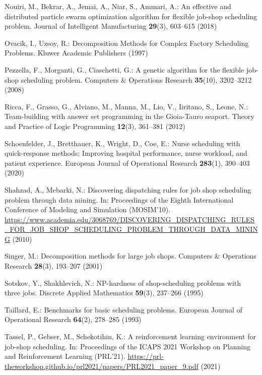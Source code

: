 \begin{thebibliography}{10}
Nouiri, M., Bekrar, A., Jemai, A., Niar, S., Ammari, A.: An effective and
  distributed particle swarm optimization algorithm for flexible job-shop
  scheduling problem. Journal of Intelligent Manufacturing  \textbf{29}(3),
  603--615 (2018)

Ovacik, I., Uzsoy, R.: Decomposition Methods for Complex Factory Scheduling
  Problems. Kluwer Academic Publishers (1997)

Pezzella, F., Morganti, G., Ciaschetti, G.: A genetic algorithm for the
  flexible job-shop scheduling problem. Computers \& Operations Research
  \textbf{35}(10),  3202--3212 (2008)

Ricca, F., Grasso, G., Alviano, M., Manna, M., Lio, V., Iiritano, S., Leone,
  N.: Team-building with answer set programming in the {G}ioia-{T}auro seaport.
  Theory and Practice of Logic Programming  \textbf{12}(3),  361--381 (2012)

Schoenfelder, J., Bretthauer, K., Wright, D., Coe, E.: Nurse scheduling with
  quick-response methods: Improving hospital performance, nurse workload, and
  patient experience. European Journal of Operational Research
  \textbf{283}(1),  390--403 (2020)

Shahzad, A., Mebarki, N.: Discovering dispatching rules for job shop scheduling
  problem through data mining. In: Proceedings of the Eighth International
  Conference of Modeling and Simulation (MOSIM'10).
  \url{https://www.academia.edu/3068769/DISCOVERING_DISPATCHING_RULES_FOR_JOB_SHOP_SCHEDULING_PROBLEM_THROUGH_DATA_MINING}
  (2010)

Singer, M.: Decomposition methods for large job shops. Computers \& Operations
  Research  \textbf{28}(3),  193--207 (2001)

Sotskov, Y., Shakhlevich, N.: {NP}-hardness of shop-scheduling problems with
  three jobs. Discrete Applied Mathematics  \textbf{59}(3),  237--266 (1995)

Taillard, E.: Benchmarks for basic scheduling problems. European Journal of
  Operational Research  \textbf{64}(2),  278--285 (1993)

Tassel, P., Gebser, M., Schekotihin, K.: A reinforcement learning environment
  for job-shop scheduling. In: Proceedings of the ICAPS 2021 Workshop on
  Planning and Reinforcement Learning (PRL'21).
  \url{https://prl-theworkshop.github.io/prl2021/papers/PRL2021_paper_9.pdf}
  (2021)


\end{thebibliography}
